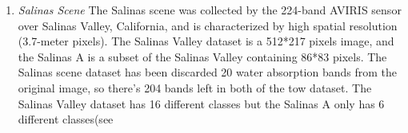 \documentclass{article}
\newcommand\crule[3][black]{\textcolor{#1}{\rule{#2}{#3}}}
\begin{document}
\begin{enumerate}[1)]
\begin{table}[h]
\begin{tabular}{|c|c|}
\begin{tabular}{ccc}
					\crule[pavia6]{0.02\textwidth}{0.02\textwidth} &Tiles &1260   \\
					\crule[pavia7]{0.02\textwidth}{0.02\textwidth} &Shadows &476    \\
					\crule[pavia8]{0.02\textwidth}{0.02\textwidth} &Meadows &824    \\
					\crule[pavia9]{0.02\textwidth}{0.02\textwidth} &Bare Soil &820    \\
				\end{tabular}&
				\begin{tabular}{ccc}
					\footnotesize
					\textit{color}&\textit{land-cover type}&\textit{number}\\
					\hline
					\crule[paviaU1]{0.02\textwidth}{0.02\textwidth} &Asphalt &6631   \\
					\crule[paviaU2]{0.02\textwidth}{0.02\textwidth} &Meadows &18649  \\
					\crule[paviaU3]{0.02\textwidth}{0.02\textwidth} &Gravel &2099   \\
					\crule[paviaU4]{0.02\textwidth}{0.02\textwidth} &Trees &3064   \\
					\crule[paviaU5]{0.02\textwidth}{0.02\textwidth} &Painted metal sheets &1345   \\
					\crule[paviaU6]{0.02\textwidth}{0.02\textwidth} &Bare Soil &5029   \\
					\crule[paviaU7]{0.02\textwidth}{0.02\textwidth} &Bitumen &1330   \\
					\crule[paviaU8]{0.02\textwidth}{0.02\textwidth} &Self-Blocking Bricks &3682   \\
					\crule[paviaU9]{0.02\textwidth}{0.02\textwidth} &Shadows &947    \\
				\end{tabular}\\
				\hline
			\end{tabular}
			\caption{Number of samples in two Pavia scene dataset.}
			\label{paviagt}
		\end{table}
		\item \textit{Salinas Scene} The Salinas scene was collected by the 224-band AVIRIS sensor over Salinas Valley,
		California, and is characterized by high spatial resolution (3.7-meter pixels).
		The Salinas Valley dataset is a 512*217 pixels image, and the Salinas A is a subset of the Salinas Valley
		containing 86*83 pixels.
		The Salinas scene dataset has been discarded 20 water absorption bands from the original image, so there's 204
		bands left in both of the tow dataset.
		The Salinas Valley dataset has 16 different classes but the Salinas A only has 6 different classes(see

\end{enumerate}
\end{document}
